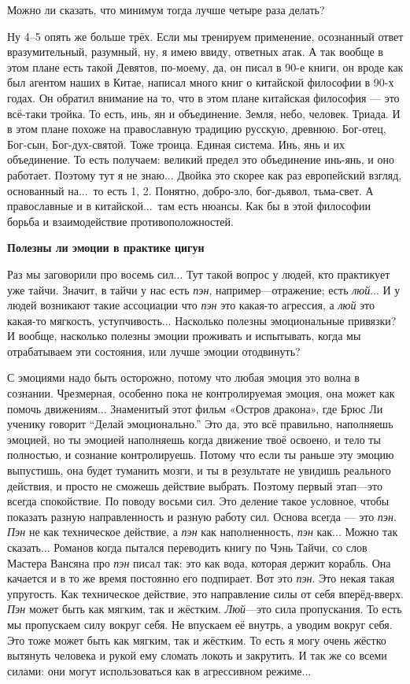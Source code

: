 \A
Можно ли сказать, что минимум тогда лучше четыре раза делать?

\T
Ну 4--5 опять же больше трёх. Если мы тренируем применение, осознанный ответ
вразумительный, разумный, ну, я имею ввиду, ответных атак. А так вообще в этом плане есть
такой Девятов, по-моему, да, он писал в 90-е книги, он вроде как был агентом наших в Китае,
написал много книг о китайской философии в 90-х годах.
Он обратил внимание на то, что в этом плане
китайская философия --- это всё-таки тройка. То есть, инь, ян и объединение.
Земля, небо, человек. Триада. И в этом плане похоже на православную традицию русскую,
древнюю.
Бог-отец, Бог-сын, Бог-дух-святой. Тоже троица. Единая система.
Инь, янь
и их объединение. То есть получаем: великий предел это объединение инь-янь, и оно работает.
Поэтому тут я не знаю... Двойка это скорее как раз европейский взгляд, основанный на...\
то есть 1, 2. Понятно, добро-зло, бог-дьявол, тьма-свет. А
православные и в китайской...\ там есть нюансы.
Как бы в этой философии борьба и взаимодействие противоположностей.

\null
\centerline{\bf Полезны ли эмоции в практике цигун}
\null

\A
Раз мы заговорили про восемь сил... Тут такой вопрос у людей, кто практикует уже тайчи.
Значит, в тайчи у нас есть {\it пэн\/}, например---отражение; есть {\it люй}...
И у людей возникают такие ассоциации что
{\it пэн\/} это какая-то агрессия, а {\it люй\/} это какая-то мягкость, уступчивость...
Насколько полезны эмоциональные привязки?
И вообще, насколько полезны эмоции проживать и испытывать, когда мы отрабатываем эти
состояния, или лучше эмоции отодвинуть?

\T
С эмоциями надо быть осторожно, потому что любая эмоция это волна в сознании.
Чрезмерная, особенно пока не контролируемая эмоция, она может как помочь
движениям... Знаменитый этот фильм «Остров дракона», где Брюс Ли ученику говорит
``Делай эмоционально.'' Это да, это всё правильно, наполняешь эмоцией, но ты
эмоцией наполняешь когда движение твоё освоено, и тело ты полностью, и сознание
контролируешь. Потому что если ты раньше эту эмоцию выпустишь, она будет туманить мозги, и ты в
результате не увидишь реального действия, и просто не сможешь действие выбрать. Поэтому
первый этап---это всегда спокойствие.\hfil\break
\indent
По поводу восьми сил. Это деление такое условное,
чтобы показать разную направленность и разную работу сил.
Основа всегда --- это {\it пэн}. {\it Пэн\/} не как техническое действие, а {\it пэн\/}
как наполненность, {\it пэн\/} как... Можно так сказать...
Романов когда пытался переводить книгу по Чэнь Тайчи, со слов Мастера Вансяна про {\it пэн\/}
писал так:
это как вода, которая держит корабль. Она качается и в то же время постоянно его
подпирает. Вот это {\it пэн}.
Это некая такая упругость. Как техническое действие, это направление силы от себя вперёд-вверх.
{\it Пэн\/} может быть как мягким, так и жёстким.
{\it Люй\/}---это сила пропускания. То есть мы пропускаем силу вокруг себя.
Не впускаем её внутрь, а уводим вокруг себя.
Это тоже может быть как мягким, так и жёстким. То есть я могу очень жёстко вытянуть
человека и рукой ему сломать локоть и закрутить. И так же со всеми силами:
они могут использоваться как в агрессивном режиме...

